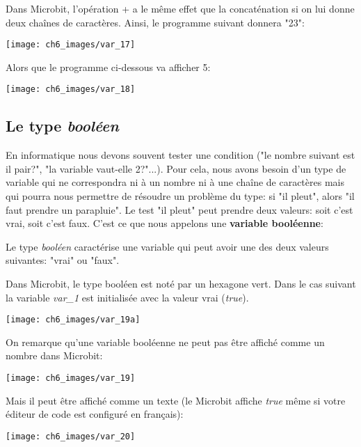 \documentclass[11pt, a4paper]{book}
\begin{document}
Dans Microbit, l'opération + a le même effet que la concaténation si on lui donne deux chaînes de caractères. Ainsi, le programme suivant donnera "23":

\begin{center}
\texttt{[image: ch6\_images/var\_17]}
\end{center}

Alors que le programme ci-dessous va afficher 5:

\begin{center}
\texttt{[image: ch6\_images/var\_18]}
\end{center}

\subsection{Le type {\it booléen}}

En informatique nous devons souvent tester une condition ("le nombre suivant est il pair?", "la variable vaut-elle 2?"...). Pour cela, nous avons besoin d'un type de variable qui ne correspondra ni à un nombre ni à une chaîne de caractères mais qui pourra nous permettre de résoudre un problème du type: si "il pleut", alors "il faut prendre un parapluie". Le test "il pleut" peut prendre deux valeurs: soit c'est vrai, soit c'est faux. C'est ce que nous appelons une {\bf variable booléenne}:

\begin{defi}
Le type {\it booléen} caractérise une variable qui peut avoir une des deux valeurs suivantes: "vrai" ou "faux".
\end{defi}

Dans Microbit, le type booléen est noté par un hexagone vert. Dans le cas suivant la variable {\it var\_1} est initialisée avec la valeur vrai ({\it true}).
\begin{center}
\texttt{[image: ch6\_images/var\_19a]}
\end{center}

On remarque qu'une variable booléenne ne peut pas être affiché comme un nombre dans Microbit:

\begin{center}
\texttt{[image: ch6\_images/var\_19]}
\end{center}

Mais il peut être affiché comme un texte (le Microbit affiche {\it true} même si votre éditeur de code est configuré en français):

\begin{center}
\texttt{[image: ch6\_images/var\_20]}
\end{center}
\end{document}
